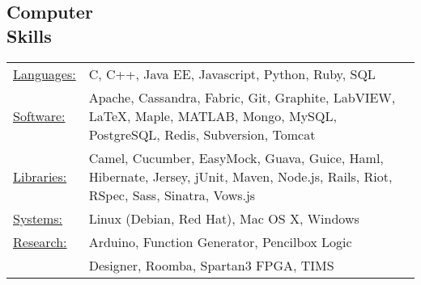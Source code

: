 \documentclass[margin]{res}
\begin{document}
\begin{resume}
\section{Computer \\ Skills}
   \begin{tabular}{l p{3in}}
    \underline{Languages:} & C, C++, Java EE, Javascript, Python, Ruby, SQL \\
     \underline{Software:} & Apache, Cassandra,
Fabric, 
Git,
Graphite, 
LabVIEW,
\LaTeX, Maple,
     MATLAB, Mongo, MySQL, PostgreSQL, Redis, Subversion, Tomcat \\
     \underline{Libraries:} & Camel, Cucumber, EasyMock, Guava, Guice, Haml, Hibernate, Jersey, jUnit, Maven, Node.js, Rails, Riot, RSpec, Sass, Sinatra, Vows.js \\
     \underline{Systems:} & Linux (Debian, Red Hat), Mac OS X, Windows \\
     \underline{Research:} & Arduino, Function Generator, Pencilbox Logic \\ & Designer, Roomba, Spartan3 FPGA, TIMS
\end{tabular}


\end{resume}
\end{document}

